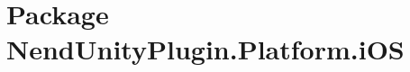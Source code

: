 \hypertarget{namespace_nend_unity_plugin_1_1_platform_1_1i_o_s}{}\section{Package Nend\+Unity\+Plugin.\+Platform.\+i\+O\+S}
\label{namespace_nend_unity_plugin_1_1_platform_1_1i_o_s}
